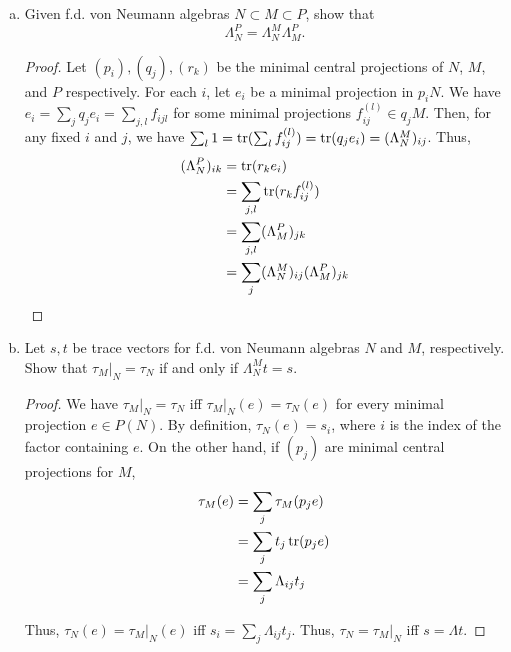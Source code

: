 \documentclass{article}
\begin{document}
  \begin{enumerate}[(a)]
    \item  Given f.d. von Neumann algebras $N \subset M \subset P$, show that
      $$\Lambda_N^P = \Lambda_N^M \Lambda_M^P.$$
      \begin{proof}
        Let $(p_i), (q_j), (r_k)$ be the minimal central projections of $N$, $M$, and $P$ respectively.  For each $i$, let $e_i$ be a minimal projection in $p_iN$.   We have $e_i = \sum_j q_j e_i = \sum_{j,l} f_{ijl}$ for some minimal projections $f_{ij}^{(l)} \in q_j M$.  Then, for any fixed $i$ and $j$, we have $\sum_l 1 = \operatorname{tr}(\sum_l f_{ij}^{(l)}) = \operatorname{tr}(q_j e_i) = (\Lambda_N^M)_{ij}$. Thus, 
        \begin{align*}
          (\Lambda_N^P)_{ik} & = \operatorname{tr}(r_k e_i) \\
          & = \sum_{j,l} \operatorname{tr}(r_k f_{ij}^{(l)} ) \\
          & = \sum_{j,l} (\Lambda_M^P)_{jk} \\
          & = \sum_j  (\Lambda_N^M)_{ij} (\Lambda_M^P)_{jk}
        \end{align*}
      \end{proof}

      \item Let $s,t$ be trace vectors for f.d. von Neumann algebras $N$ and $M$, respectively.  Show that $\tau_M|_N = \tau_N$ if and only if $\Lambda_N^M t = s$.
        \begin{proof}
          We have $\tau_M|_N = \tau_N$ iff $\tau_M|_N(e) = \tau_N(e)$ for every minimal projection $e \in P(N)$.  By definition, $\tau_N(e) = s_i$, where $i$ is the index of the factor containing $e$.  On the other hand, if $(p_j)$ are minimal central projections for $M$,
\begin{align*}
  \tau_M(e) & = \sum_j \tau_M(p_j e) \\
  & = \sum_j t_j \operatorname{tr}(p_j e) \\
  & = \sum_j \Lambda_{ij} t_j  
\end{align*}

Thus, $\tau_N(e) = \tau_M|_N(e)$ iff $s_i = \sum_j \Lambda_{ij} t_j$.  Thus,
$\tau_N = \tau_M|_N$ iff $s = \Lambda t$.


      \end{proof}
  \end{enumerate}
\end{document}
